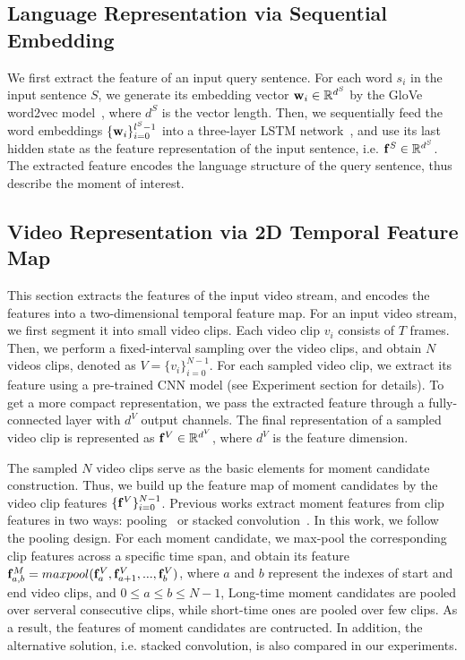 \documentclass[letterpaper]{article} %
\begin{document}
\subsection{Language Representation via Sequential Embedding}

We first extract the feature of an input query sentence. For each word $s_i$ in the input sentence $S$, we generate its embedding vector ${\bf{w}}_i \in \mathbb{R}^{d^S}$ by the GloVe word2vec model~\cite{pennington2014glove}, where $d^S$ is the vector length. Then, we sequentially feed the word embeddings $\{ {\bf{w}}_i \}_{i=0}^{l^S-1}$ into a three-layer LSTM network~\cite{hochreiter1997long}, and use its last hidden state as the feature representation of the input sentence, i.e. ${\bf{f}}^S\in \mathbb{R}^{d^{S}}$. The extracted feature encodes the language structure of the query sentence, thus describe the moment of interest.


\subsection{Video Representation via 2D Temporal Feature Map}
This section extracts the features of the input video stream, and encodes the features into a two-dimensional temporal feature map. 
For an input video stream, we first segment it into small video clips. 
Each video clip $v_i$ consists of $T$ frames. 
Then, we perform a fixed-interval sampling over the video clips, and obtain $N$ videos clips, denoted as $V=\{v_i\}_{i=0}^{N-1}$. 
For each sampled video clip, we extract its feature using a pre-trained CNN model (see Experiment section for details). To get a more compact representation, we pass the extracted feature through a fully-connected layer with $d^V$ output channels. The final representation of a sampled video clip is represented as ${\bf{f}}^V \in {\mathbb{R}}^{d^V}$, where $d^V$ is the feature dimension. 

The sampled $N$ video clips serve as the basic elements for moment candidate construction. Thus, we build up the feature map of moment candidates by the video clip features $ {{\{{\bf{f}}^V}\}_{i=0}^{N-1}}$.
Previous works extract moment features from clip features in two ways: pooling~\cite{hendricks17iccv} or stacked convolution~\cite{zhang2019man}.
In this work, we follow the pooling design. For each moment candidate, we max-pool the corresponding clip features across a specific time span, and obtain its feature  ${{\bf{f}}_{a,b}^M}=maxpool({{\bf{f}}_a^V}, {{\bf{f}}_{a+1}^V}, ..., {{\bf{f}}_b^V})$, where $a$ and $b$ represent the indexes of start and end video clips, and $0 \le a \le b \le N-1$,
Long-time moment candidates are pooled over serveral consecutive clips, while short-time ones are pooled over few clips. As a result, the features of moment candidates are contructed.
In addition, the alternative solution, i.e. stacked convolution, is also compared in our experiments.
\end{document}
